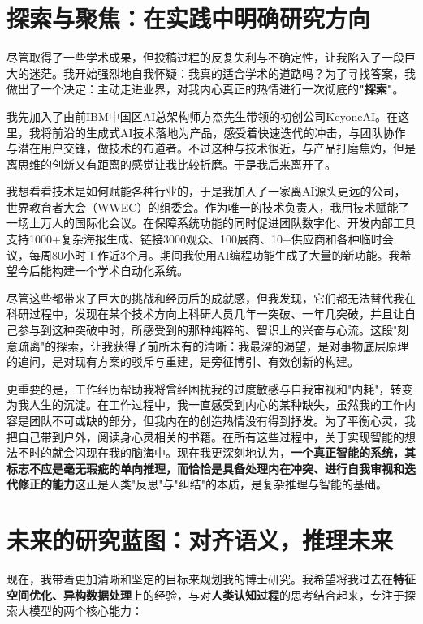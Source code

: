 \documentclass[11pt, letterpaper]{article}
\begin{document}
\section{探索与聚焦：在实践中明确研究方向}

尽管取得了一些学术成果，但投稿过程的反复失利与不确定性，让我陷入了一段巨大的迷茫。我开始强烈地自我怀疑：我真的适合学术的道路吗？为了寻找答案，我做出了一个决定：主动走进业界，对我内心真正的热情进行一次彻底的\textbf{"探索"}。

我先加入了由前IBM中国区AI总架构师方杰先生带领的初创公司KeyoneAI。在这里，我将前沿的生成式AI技术落地为产品，感受着快速迭代的冲击，与团队协作与潜在用户交锋，做技术的布道者。不过这种与技术很近，与产品打磨焦灼，但是离思维的创新又有距离的感觉让我比较折磨。于是我后来离开了。

我想看看技术是如何赋能各种行业的，于是我加入了一家离AI源头更远的公司，世界教育者大会（WWEC）的组委会\cite{wwec}。作为唯一的技术负责人，我用技术赋能了一场上万人的国际化会议。在保障系统功能的同时促进团队数字化、开发内部工具支持1000+复杂海报生成、链接3000观众、100展商、10+供应商和各种临时会议，每周80小时工作近3个月。期间我使用AI编程功能生成了大量的新功能。我希望今后能构建一个学术自动化系统。

尽管这些都带来了巨大的挑战和经历后的成就感，但我发现，它们都无法替代我在科研过程中，发现在某个技术方向上科研人员几年一突破、一年几突破，并且让自己参与到这种突破中时，所感受到的那种纯粹的、智识上的兴奋与心流。这段"刻意疏离"的探索，让我获得了前所未有的清晰：我最深的渴望，是对事物底层原理的追问，是对现有方案的驳斥与重建，是旁征博引、有效创新的构建。

更重要的是，工作经历帮助我将曾经困扰我的过度敏感与自我审视和"内耗"，转变为我人生的沉淀。在工作过程中，我一直感受到内心的某种缺失，虽然我的工作内容是团队不可或缺的部分，但我内在的创造热情没有得到抒发。为了平衡心灵，我把自己带到户外，阅读身心灵相关的书籍。在所有这些过程中，关于实现智能的想法不时的就会闪现在我的脑海中。现在我更深刻地认为，\textbf{一个真正智能的系统，其标志不应是毫无瑕疵的单向推理，而恰恰是具备处理内在冲突、进行自我审视和迭代修正的能力}这正是人类"反思"与"纠结"的本质，是复杂推理与智能的基础。

\section{未来的研究蓝图：对齐语义，推理未来}

现在，我带着更加清晰和坚定的目标来规划我的博士研究。我希望将我过去在\textbf{特征空间优化、异构数据处理}上的经验，与对\textbf{人类认知过程}的思考结合起来，专注于探索大模型的两个核心能力：
\end{document}
